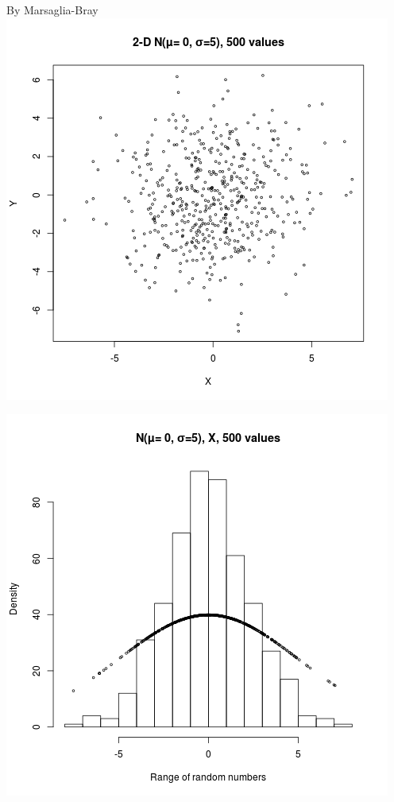 \documentclass{article}
\begin{document}
By Marsaglia-Bray
\includegraphics{"plot4_1"}
\pagebreak

\includegraphics{"plot4_1_X"}
\pagebreak
\end{document}
